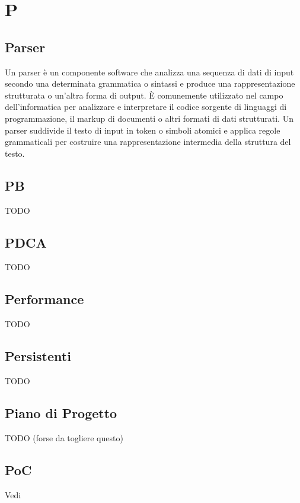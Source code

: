 \section{P}

\vspace{2em}
\subsection*{Parser}
Un parser è un componente software che analizza una sequenza di dati di input secondo una determinata grammatica o sintassi e produce una rappresentazione strutturata o un'altra forma di output. È comunemente utilizzato nel campo dell'informatica per analizzare e interpretare il codice sorgente di linguaggi di programmazione, il markup di documenti o altri formati di dati strutturati. Un parser suddivide il testo di input in token o simboli atomici e applica regole grammaticali per costruire una rappresentazione intermedia della struttura del testo.

\vspace{2em}
\subsection*{PB}
TODO

\vspace{2em}
\subsection*{PDCA}
TODO

\vspace{2em}
\subsection*{Performance}
TODO

\vspace{2em}
\subsection*{Persistenti}
TODO

\vspace{2em}
\subsection*{Piano di Progetto}
TODO (forse da togliere questo)

\vspace{2em}
\subsection*{PoC}
\par Vedi 


